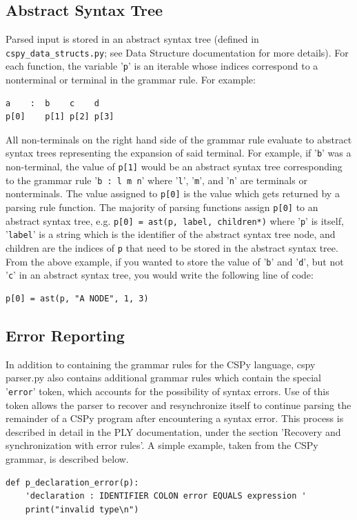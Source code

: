 \documentclass{article}
\begin{document}
\subsection{Abstract Syntax Tree}
Parsed input is stored in an abstract syntax tree (defined in \verb|cspy_data_structs.py|; see Data Structure documentation for more details). For each function, the variable '\verb|p|' is an iterable whose indices correspond to a nonterminal or terminal in the grammar rule. For example:
\begin{verbatim}
a    :  b    c    d
p[0]    p[1] p[2] p[3]
\end{verbatim}
All non-terminals on the right hand side of the grammar rule evaluate to abstract syntax trees representing the expansion of said terminal. For example, if '\verb|b|' was a non-terminal, the value of \verb|p[1]| would be an abstract syntax tree corresponding to the grammar rule '\verb|b : l m n|' where '\verb|l|', '\verb|m|', and '\verb|n|' are terminals or nonterminals. The value assigned to \verb|p[0]| is the value which gets returned by a parsing rule function. The majority of parsing functions assign \verb|p[0]| to an abstract syntax tree, e.g. \verb|p[0] = ast(p, label, children*)| where '\verb|p|' is itself, '\verb|label|' is a string which is the identifier of the abstract syntax tree node, and children are the indices of \verb|p| that need to be stored in the abstract syntax tree. From the above example, if you wanted to store the value of '\verb|b|' and '\verb|d|', but not '\verb|c|' in an abstract syntax tree, you would write the following line of code:
\begin{verbatim}
p[0] = ast(p, "A NODE", 1, 3)
\end{verbatim}
\subsection{Error Reporting}
In addition to containing the grammar rules for the CSPy language, cspy parser.py also contains additional grammar rules which contain the special '\verb|error|' token, which accounts for the possibility of syntax errors. Use of this token allows the parser to recover and resynchronize itself to continue parsing the remainder of a CSPy program after encountering a syntax error. This process is described in detail in the PLY documentation, under the section 'Recovery and synchronization with error rules'. A simple example, taken from the CSPy grammar, is described below.

\begin{verbatim}
def p_declaration_error(p):
    'declaration : IDENTIFIER COLON error EQUALS expression '
    print("invalid type\n")
\end{verbatim}
\end{document}
